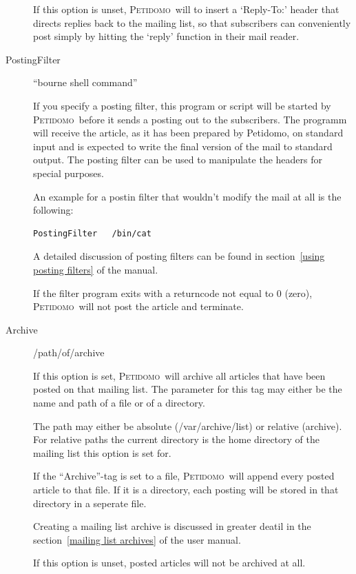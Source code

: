 \documentclass[a4paper,10pt]{scrreprt}
\newcommand{\Petidomo}{{\scshape Peti\-domo}}
\newcommand{\file}[1]{{\sf #1}}
\begin{document}
\begin{description}
If this option is unset, \Petidomo\ will to insert a `Reply-To:'
header that directs replies back to the mailing list, so that
subscribers can conveniently post simply by hitting the `reply'
function in their mail reader.

\item[PostingFilter] \hfill ``bourne shell command''

If you specify a posting filter, this program or script will be
started by \Petidomo\ before it sends a posting out to the
subscribers. The programm will receive the article, as it has been
prepared by Petidomo, on standard input and is expected to write the
final version of the mail to standard output. The posting filter can
be used to manipulate the headers for special purposes.

An example for a postin filter that wouldn't modify the mail at all is
the following:
\begin{verbatim}
PostingFilter   /bin/cat
\end{verbatim}

A detailed discussion of posting filters can be found in
section~\ref{using posting filters} of the manual.

If the filter program exits with a returncode not equal to 0 (zero),
\Petidomo\ will not post the article and terminate.


\item[Archive] \hfill \file{/path/of/archive}

If this option is set, \Petidomo\ will archive all articles that have
been posted on that mailing list. The parameter for this tag may
either be the name and path of a file or of a directory.

The path may either be absolute (\file{/var/archive/list}) or relative
(\file{archive}). For relative paths the current directory is the home
directory of the mailing list this option is set for.

If the ``Archive''-tag is set to a file, \Petidomo\ will append every
posted article to that file. If it is a directory, each posting will
be stored in that directory in a seperate file.

Creating a mailing list archive is discussed in greater deatil in the
section~\ref{mailing list archives} of the user manual.

If this option is unset, posted articles will not be archived at all.

\end{description}
\end{document}

